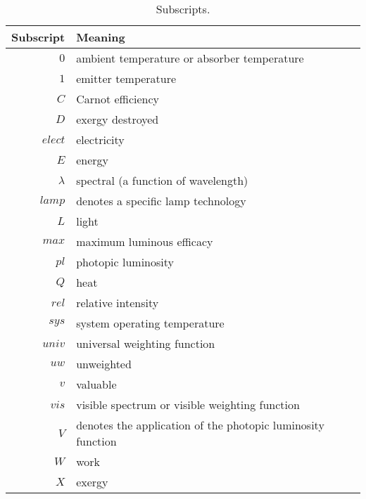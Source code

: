   
\begin{table}
\centering
\caption{Subscripts.}
\begin{tabular}{r l}
\toprule
Subscript & Meaning \\
\midrule
$0$ & ambient temperature or absorber temperature \\
$1$ & emitter temperature \\
$C$ & Carnot efficiency \\
$D$ & exergy destroyed \\
$elect$ & electricity \\
$E$ & energy \\
$\lambda$ & spectral (a function of wavelength) \\
$lamp$ & denotes a specific lamp technology \\
$L$ & light \\
$max$ & maximum luminous efficacy \\
$pl$ & photopic luminosity \\
$Q$ & heat \\
$rel$ & relative intensity \\
$sys$ & system operating temperature \\
$univ$ & universal weighting function \\
$uw$ & unweighted \\
$v$ & valuable \\
$vis$ & visible spectrum or visible weighting function \\
$V$ & denotes the application of the photopic luminosity function \\
$W$ & work \\
$X$ & exergy \\
\bottomrule
\end{tabular}
\label{tab:subscripts}
\end{table}


